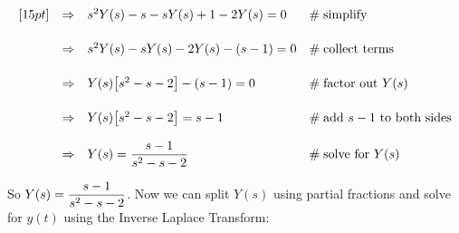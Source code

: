 \documentclass{article}
\theoremstyle{definition}
\begin{document}
\begin{equation*}
\begin{array}{lllll}
[15pt]
&\Rightarrow&  s^2 Y(s) -s  - sY(s) + 1 -2 Y(s)                                                                                      = 0             &\mathrel{\#} \text{simplify}                                                                                                                 \\
[15pt]          
&\Rightarrow&  s^2 Y(s) - s Y(s) - 2 Y(s) - (s - 1)                                                                                   = 0             &\mathrel{\#} \text{collect terms}                                                                                                         \\
[15pt]
&\Rightarrow&  Y(s) \big [s^2- s - 2 \big] - (s - 1)                                                                                   = 0             &\mathrel{\#} \text{factor out $Y(s)$}                                                                                                   \\
[15pt]
&\Rightarrow&  Y(s) \big [s^2- s - 2 \big]                                                                                               = s - 1         &\mathrel{\#} \text{add $s - 1$ to both sides}                                                                                      \\
[12pt]
&\Rightarrow&  Y(s) = \mathlarger{\frac{s - 1}{s^2 -s -2}}  &\mathrel{\#} \text{solve for $Y(s)$}
\end{array}
\end{equation*}

\bigskip
\noindent
So $Y(s) = \mathlarger{\frac{s - 1}{s^2 -s -2}}$. Now we can split $Y(s)$ using partial fractions and solve for $y(t)$ using the Inverse Laplace Transform:
\end{document}
